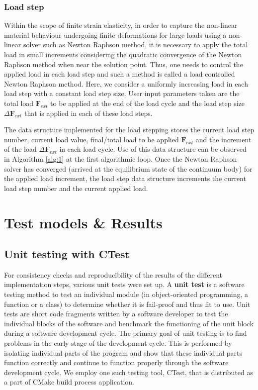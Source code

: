 \documentclass[11pt,a4paper,final]{article}
\begin{document}
\subsubsection{Load step}
Within the scope of finite strain elasticity, in order to capture the non-linear material behaviour undergoing finite deformations for large loads using a non-linear solver such as Newton Raphson method, it is necessary to apply the total load in small increments considering the quadratic convergence of the Newton Raphson method when near the solution point. Thus, one needs to control the applied load in each load step and such a method is called a load controlled Newton Raphson method. Here, we consider a uniformly increasing load in each load step with a constant load step size. User input parameters taken are the total load $\mathbf{F}_{ext}$ to be applied at the end of the load cycle and the load step size $\Delta \mathbf{F}_{ext}$ that is applied in each of these load steps. \par 
The data structure implemented for the load stepping stores the current load step number, current load value, final/total load to be applied $\mathbf{F}_{ext}$ and the increment of the load $\Delta \mathbf{F}_{ext}$ in each load cycle. Use of this data structure can be observed in Algorithm \eqref{alg:1} at the first algorithmic loop. Once the Newton Raphson solver has converged (arrived at the equilibrium state of the continuum body) for the applied load increment, the load step data structure increments the current load step number and the current applied load.
 
\section{Test models \& Results}

\subsection{Unit testing with CTest}
For consistency checks and reproducibility of the results of the different implementation steps, various unit tests were set up. A \textbf{unit test} is a software testing method to test an individual module (in object-oriented programming, a function or a class) to determine whether it is fail-proof and thus fit to use. Unit tests are short code fragments written by a software developer to test the individual blocks of the software and benchmark the functioning of the unit block during a software development cycle. The primary goal of unit testing is to find problems in the early stage of the development cycle. This is performed by isolating individual parts of the program and show that these individual parts function correctly and continue to function properly through the software development cycle. We employ one such testing tool, CTest, that is distributed as a part of CMake build process application. \par 
\end{document}
